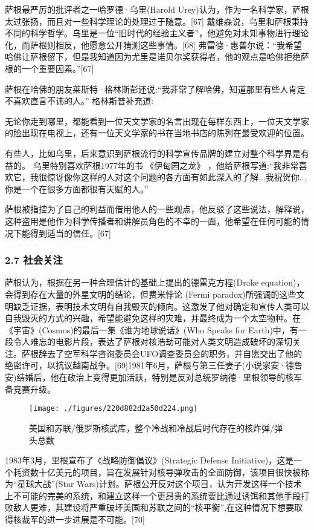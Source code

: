 萨根最严厉的批评者之一哈罗德·乌里(Harold Urey)认为，作为一名科学家，萨根太过张扬，而且对一些科学理论的处理过于随意。[67] 戴维森说，乌里和萨根秉持不同的科学哲学。乌里是一位“旧时代的经验主义者”，他避免对未知事物进行理论化，而萨根则相反，他愿意公开猜测这些事情。[68] 弗雷德·惠普尔说：“我希望哈佛让萨根留下，但是我知道因为尤里是诺贝尔奖获得者，他的观点是哈佛拒绝萨根的一个重要因素。”[67]

萨根在哈佛的朋友莱斯特·格林斯彭还说:“我非常了解哈佛，知道那里有些人肯定不喜欢直言不讳的人。” 格林斯普补充道:

无论你走到哪里，都能看到一位天文学家的名言出现在每样东西上，一位天文学家的脸出现在电视上，还有一位天文学家的书在当地书店的陈列在最受欢迎的位置。

有些人，比如乌里，后来意识到萨根流行的科学宣传品牌的建立对整个科学界是有益的。 乌里特别喜欢萨根1977年的书 《伊甸园之龙》 ，他给萨根写道:“我非常喜欢它，我很惊讶像你这样的人对这个问题的各方面有如此深入的了解...我祝贺你...你是一个在很多方面都很有天赋的人。”

萨根被指控为了自己的利益而借用他人的一些观点，他反驳了这些说法，解释说，这种盗用是他作为科学传播者和讲解员角色的不幸的一面，他希望在任何可能的情况下能得到适当的信任。[67]
\subsubsection{2.7 社会关注}
萨根认为，根据在另一种合理估计的基础上提出的德雷克方程(Drake equation)，会得到存在大量的外星文明的结论，但费米悖论 (Fermi paradox)所强调的这些文明缺乏证据，表明技术文明有自我毁灭的倾向。这激发了他对确定和宣传人类可以自我毁灭的方式的兴趣，希望能避免这样的灾难，并最终成为一个太空物种。在《宇宙》(Cosmos)的最后一集《谁为地球说话》(Who Speaks for Earth)中，有一段令人难忘的电影片段，表达了萨根对核浩劫可能对人类文明造成破坏的深切关注。萨根辞去了空军科学咨询委员会UFO调查委员会的职务，并自愿交出了他的绝密许可，以抗议越南战争。[69]1981年6月，萨根与第三任妻子(小说家安·德鲁安)结婚后，他在政治上变得更加活跃，特别是反对总统罗纳德·里根领导的核军备竞赛升级。
\begin{figure}[ht]
\centering
\texttt{[image: ./figures/220d882d2a50d224.png]}
\caption{美国和苏联/俄罗斯核武库，整个冷战和冷战后时代存在的核炸弹/弹头总数} \label{fig_Sagan_8}
\end{figure}
1983年3月，里根宣布了《战略防御倡议》(Strategic Defense Initiative)，这是一个耗资数十亿美元的项目，旨在发展针对核导弹攻击的全面防御，该项目很快被称为“星球大战”(Star Wars)计划。萨根公开反对这个项目，认为开发这样一个技术上不可能的完美的系统，和建立这样一个更昂贵的系统要比通过诱饵和其他手段打败敌人更难，其建设将严重破坏美国和苏联之间的“核平衡”,在这种情况下想要取得核裁军的进一步进展是不可能。[70]

